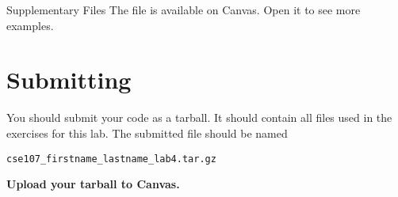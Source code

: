 \documentclass[11pt]{cselabheader}
\begin{document}
\begin{infobox}{Supplementary Files}
The file  is available on Canvas.
Open it to see more examples.
\end{infobox}

\pagebreak
\section{Submitting}

You should submit your code as a tarball. It should contain all files
used in the exercises for this lab. The submitted file should be named
\begin{center}
  \texttt{cse107\_firstname\_lastname\_lab4.tar.gz}
\end{center}

\begin{center}
  \textbf{Upload your tarball to Canvas.}
\end{center}

\listoftheorems
\end{document}
